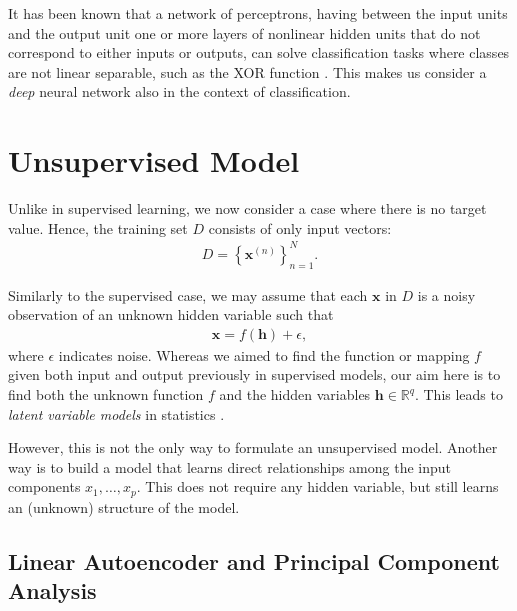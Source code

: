 \documentclass[dissertation,nocontribution,draft*]{aaltoseries}
\newcommand{\vect}[1]{\mathbf{#1}}
\newcommand{\vh}[0]{\vect{h}}
\newcommand{\vx}[0]{\vect{x}}
\newcommand{\RR}[0]{\mathbb{R}}
\begin{document}
It has been known that a network of perceptrons, having
between the input units and the output unit one or more
layers of nonlinear hidden units that do not correspond to
either inputs or outputs, can solve classification tasks
where classes are not linear separable, such as the XOR
function \citep[see, e.g.,][]{Touretzky1989}. This makes us
consider a \textit{deep} neural network also in the context
of classification.




\section{Unsupervised Model}
\label{sec:unsupervised_model}

Unlike in supervised learning, we now consider a case where
there is no target value. Hence, the training set $D$ consists of
only input vectors:
\begin{align}
    \label{eq:unsup_train}
D=\left\{ \vx^{(n)} \right\}_{n=1}^N.
\end{align}

Similarly to the supervised case, we may assume that each
$\vx$ in $D$ is a noisy observation of an unknown hidden
variable such that
\begin{align}
    \label{eq:lvm}
    \vx = f(\vh) + \epsilon,
\end{align}
where $\epsilon$ indicates noise. Whereas we aimed
to find the function or mapping $f$ given both input and
output previously in supervised models, our aim here is to
find both the unknown function $f$ and the hidden variables
$\vh \in \RR^q$. This leads to 
\textit{latent variable models} in statistics \citep[see,
e.g.,][]{Murphy2012}.

However, this is not the only way to formulate an
unsupervised model. Another way is to build a model that
learns direct relationships among the input components $x_1,
\dots, x_p$. This does not require any hidden variable, but
still learns an (unknown) structure of the model.


\subsection{Linear Autoencoder and Principal Component Analysis}
\label{sec:linear_autoencoder}
\end{document}
